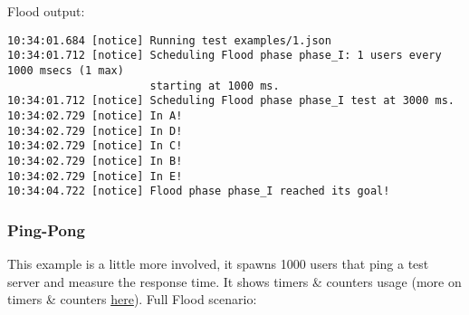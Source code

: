 \documentclass[a4paper]{article}
\begin{document}
\noindent
Flood output:


\begin{verbatim}
10:34:01.684 [notice] Running test examples/1.json
10:34:01.712 [notice] Scheduling Flood phase phase_I: 1 users every 1000 msecs (1 max)
                      starting at 1000 ms.
10:34:01.712 [notice] Scheduling Flood phase phase_I test at 3000 ms.
10:34:02.729 [notice] In A!
10:34:02.729 [notice] In D!
10:34:02.729 [notice] In C!
10:34:02.729 [notice] In B!
10:34:02.729 [notice] In E!
10:34:04.722 [notice] Flood phase phase_I reached its goal!
\end{verbatim}
\subsubsection{Ping-Pong}
\label{sec-3-7-2}

This example is a little more involved, it spawns 1000 users that ping a test server and measure the response time. It shows timers \& counters usage (more on timers \& counters \hyperref[sec-2-2]{here}). Full Flood scenario:
\end{document}
